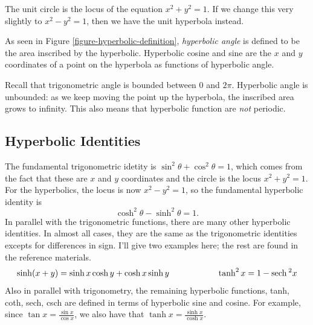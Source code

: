 \documentclass[fleqn]{report}
\begin{document}
The unit circle is the locus of the equation $x^2 + y^2 = 1$.
If we change this very slightly to $x^2 - y^2 = 1$, then we
have the unit hyperbola instead. 

\begin{defn}
As seen in Figure \ref{figure-hyperbolic-definition},
\emph{hyperbolic angle} is defined to be the area inscribed by
the hyperbolic. Hyperbolic cosine and sine are the $x$ and $y$
coordinates of a point on the hyperbola as functions of
hyperbolic angle.
\end{defn}

Recall that trigonometric angle is bounded between
0 and $2\pi$. Hyperbolic angle is unbounded: as we keep moving
the point up the hyperbola, the inscribed area grows to
infinity. This also means that hyperbolic function are
\emph{not} periodic.

\subsection{Hyperbolic Identities}
\label{hyperbolic-identities}

The fundamental trigonometric idetity is $\sin^2 \theta +
\cos^2 \theta =1$, which comes from the fact that these are
$x$ and $y$ coordinates and the circle is the locus $x^2 +
y^2 = 1$. For the hyperbolics, the locus is now $x^2 - y^2 =
1$, so the fundamental hyperbolic identity is
\begin{equation*}
\cosh^2 \theta - \sinh^2 \theta = 1.
\end{equation*}
In parallel with the trigonometric functions, there are many
other hyperbolic identities. In almost all cases, they are
the same as the trigonometric identities excepts for
differences in sign. I'll give two examples here; the
rest are found in the reference materials.
\begin{equation*}
\sinh (x+y) = \sinh x \cosh y + \cosh x \sinh y \hspace{2cm}
\tanh^2 x = 1 - \mathrm{sech}\hspace{0.07cm}^2 x
\end{equation*}
Also in parallel with trigonometry, the remaining hyperbolic
functions, tanh, coth, sech, csch are defined in terms of
hyperbolic sine and cosine. For example, since $\tan x =
\frac{\sin x}{\cos x}$, we also have that $\tanh x =
\frac{\sinh x}{\cosh x}$. 
\end{document}

